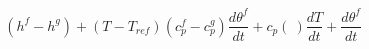 \begin{equation}
(h^f-h^g) + (T- T_{ref}) (c_p^f-c_p^g) \frac{d\theta^f }{dt} + c_p(\ ) \frac{d T}{dt} +   \frac{d\theta^f }{dt}
\end{equation}